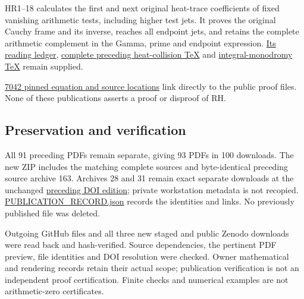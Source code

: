 \documentclass[
]{article}
\begin{document}
HR1--18 calculates the first and next original heat-trace coefficients
of fixed vanishing arithmetic tests, including higher test jets. It
proves the original Cauchy frame and its inverse, reaches all endpoint
jets, and retains the complete arithmetic complement in the Gamma, prime
and endpoint expression.
\href{https://github.com/KokunoYumeto/zeta-function-research-reader/blob/76f421965914beb133df797835f940849844dc4f/workbenches/splitzero-tandem/continuations/20260923-fixed-arithmetic-heat-flags/SOURCE_READING_AND_USE.json}{Its
reading ledger},
\href{https://github.com/KokunoYumeto/zeta-function-research-reader/blob/76f421965914beb133df797835f940849844dc4f/workbenches/splitzero-tandem/continuations/20260923-fixed-arithmetic-heat-flags/RETAINED_HEAT_COLLISION_PROOFS.tex}{complete
preceding heat-collision TeX} and
\href{https://github.com/KokunoYumeto/zeta-function-research-reader/blob/76f421965914beb133df797835f940849844dc4f/workbenches/splitzero-tandem/continuations/20260923-fixed-arithmetic-heat-flags/RETAINED_INTEGRAL_HEAT_PROOFS.tex}{integral-monodromy
TeX} remain supplied.

\href{PINNED_PROOF_LINKS.json}{7042 pinned equation and source
locations} link directly to the public proof files. None of these
publications asserts a proof or disproof of RH.

\subsection{Preservation and
verification}\label{preservation-and-verification}

All 91 preceding PDFs remain separate, giving 93 PDFs in 100 downloads.
The new ZIP includes the matching complete sources and byte-identical
preceding source archive 163. Archives 28 and 31 remain exact separate
downloads at the unchanged
\href{https://zenodo.org/records/22908744}{preceding DOI edition};
private workstation metadata is not recopied.
\url{PUBLICATION_RECORD.json} records the identities and links. No
previously published file was deleted.

Outgoing GitHub files and all three new staged and public Zenodo
downloads were read back and hash-verified. Source dependencies, the
pertinent PDF preview, file identities and DOI resolution were checked.
Owner mathematical and rendering records retain their actual scope;
publication verification is not an independent proof certification.
Finite checks and numerical examples are not arithmetic-zero
certificates.
\end{document}
